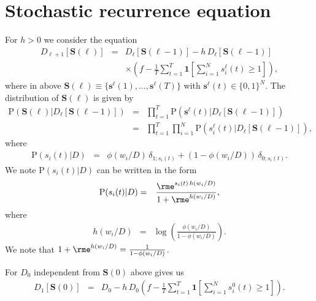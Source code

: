\documentclass[10pt]{iopart}
\newcommand{\1}{\mathbf{1}}
\newcommand{\Prob}{\mathrm{P}}
\newcommand{\sv}{\ensuremath{\mathbf{s}}}
\newcommand{\Sm}{\ensuremath{\mathbf{S}}}
\begin{document}
\section{Stochastic recurrence equation}

For $h>0$ we consider the equation 
%
\begin{eqnarray}
%
    D_{\ell+1}[\Sm(\ell)]&=& D_{\ell}[\Sm(\ell-1)]-h\, D_{\ell}[\Sm(\ell-1)]\nonumber\\
    &&\times\left(f-\frac{1}{T}\sum_{t=1}^T\1\left[\sum_{i=1}^N s^{\ell}_i(t)\ge1\right]\right)\label{eq:SRE},
\end{eqnarray}
where in above $\Sm(\ell)\equiv \{\sv^{\ell}(1),\ldots,\sv^{\ell}(T)\}$ with $\sv^{\ell}(t)\in\{0,1\}^N$. The distribution of $\Sm(\ell)$ is given by 
%
\begin{eqnarray}
\Prob\left(\Sm(\ell)\vert D_{\ell}[\Sm(\ell-1)]\right)&=&\prod_{t=1}^T\Prob(\sv^\ell(t)\vert D_{\ell}[\Sm(\ell-1)])\nonumber\\
%
&=&\prod_{t=1}^T\prod_{i=1}^N \Prob(s^\ell_i(t)\vert D_{\ell}[\Sm(\ell-1)])\label{def:Prob-S},
\end{eqnarray}
%
where 
\begin{eqnarray}
\Prob(s_i(t)\vert D)&=&\phi(w_i/D)\,\delta_{1;s_i(t)}+(1-\phi(w_i/D))\,\delta_{0;s_i(t)}.
\end{eqnarray}
%
We note $\Prob(s_i(t)\vert D)$ can be written in the form
%
\begin{eqnarray}
\Prob(s_i(t)\vert D)&=&\frac{\rme^{s_i(t)\,h(w_i/D)}}{1+\rme^{h(w_i/D)}},
\end{eqnarray}
%
where  
%
\begin{eqnarray}
h(w_i/D)&=&\log\left(\frac{\phi(w_i/D)}{1-\phi(w_i/D)}\right).
\end{eqnarray}
%
We note that $1+\rme^{h(w_i/D)}=\frac{1}{1-\phi(w_i/D)}$. 

For $D_0$  independent  from $\Sm(0)$ above gives us 
%
\begin{eqnarray}
%
    D_{1}[\Sm(0)]&=&D_{0}-h\,D_{0} \left(f-\frac{1}{T}\sum_{t=1}^T\1\left[\sum_{i=1}^N s^0_i(t)\ge1\right]\right).
\end{eqnarray}
%
\end{document}
